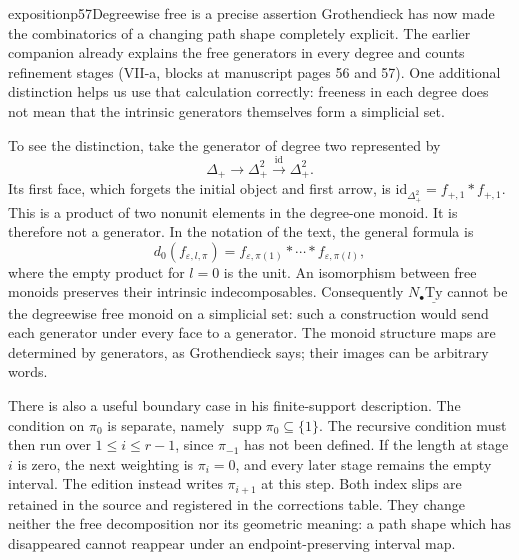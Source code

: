 \begin{dcomment}{exposition}{p57}{Degreewise free is a precise assertion}
Grothendieck has now made the combinatorics of a changing path shape completely explicit. The earlier companion already explains the free generators in every degree and counts refinement stages (VII-a, blocks at manuscript pages 56 and 57). One additional distinction helps us use that calculation correctly: freeness in each degree does not mean that the intrinsic generators themselves form a simplicial set.

To see the distinction, take the generator of degree two represented by
\[
 \Delta_+\longrightarrow\Delta_+^2
       \xrightarrow{\mathrm{id}}\Delta_+^2.
\]
Its first face, which forgets the initial object and first arrow, is
$\mathrm{id}_{\Delta_+^2}=f_{+,1}*f_{+,1}$. This is a product of two nonunit elements in the degree-one monoid. It is therefore not a generator. In the notation of the text, the general formula is
\[
 d_0(f_{\varepsilon,l,\pi})
    =f_{\varepsilon,\pi(1)}*\cdots*f_{\varepsilon,\pi(l)},
\]
where the empty product for $l=0$ is the unit. An isomorphism between free monoids preserves their intrinsic indecomposables. Consequently $N_\bullet\underline{\mathrm{Ty}}$ cannot be the degreewise free monoid on a simplicial set: such a construction would send each generator under every face to a generator. The monoid structure maps are determined by generators, as Grothendieck says; their images can be arbitrary words.

There is also a useful boundary case in his finite-support description. The condition on $\pi_0$ is separate, namely $\operatorname{supp}\pi_0\subseteq\{1\}$. The recursive condition must then run over $1\leq i\leq r-1$, since $\pi_{-1}$ has not been defined. If the length at stage $i$ is zero, the next weighting is $\pi_i=0$, and every later stage remains the empty interval. The edition instead writes $\pi_{i+1}$ at this step. Both index slips are retained in the source and registered in the corrections table. They change neither the free decomposition nor its geometric meaning: a path shape which has disappeared cannot reappear under an endpoint-preserving interval map.
\end{dcomment}

